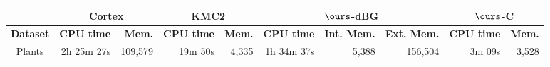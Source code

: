 
    \begin{sidewaystable}

      \small
   \centering
   \begin{tabular}{|c|r|r|r|r|r|r|r|r|r|}

     \hline
      	\multicolumn{1}{|l}{}
   	& \multicolumn{2}{|c|}{{\sc Cortex}}	
	& \multicolumn{2}{|c|}{KMC2} 
	& \multicolumn{3}{|c|}{$\ours$-dBG} 
	& \multicolumn{2}{|c|}{$\ours$-C}  \\
        \hline
            {\bf Dataset} & {\bf CPU time} & {\bf Mem.} & {\bf CPU time} & {\bf Mem.} &{\bf CPU time} & {\bf Int. Mem.} & {\bf Ext. Mem.} & {\bf CPU time} & {\bf Mem.}  \\
            \hline
            Plants & 2h 25m 27s & 109,579 &  19m 50s & 4,335 & 1h 34m 37s & 5,388 & 156,504 & 3m 09s & 3,528 \\
    


\end{tabular}
\end{sidewaystable}
